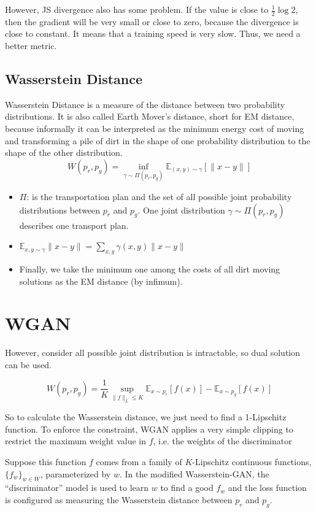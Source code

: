 However, JS divergence also has some problem. If the value is close to $\frac{1}{2}\log 2$, then the gradient will be very small or close to zero, because the divergence is close to constant. It means that a training speed is very slow. Thus, we need a better metric. 

\subsection{Wasserstein Distance}
Wasserstein Distance is a measure of the distance between two probability distributions. It is also called Earth Mover’s distance, short for EM distance, because informally it can be interpreted as the minimum energy cost of moving and transforming a pile of dirt in the shape of one probability distribution to the shape of the other distribution.
\begin{equation*}
	W(p_r, p_g) = \inf_{\gamma \sim \Pi(p_r, p_g)} \mathbb{E}_{(x, y) \sim \gamma}[\| x-y \|]
\end{equation*}

\begin{itemize}
	\item $\Pi$: is the transportation plan and the set of all possible joint probability distributions between $p_r$ and $p_g$. One joint distribution $\gamma \sim \Pi(p_r, p_g)$ describes one transport plan.\
	\item $\mathbb{E}_{x, y \sim \gamma} \| x-y \| = \sum_{x, y} \gamma(x, y) \| x-y \|$
	\item Finally, we take the minimum one among the costs of all dirt moving solutions as the EM distance (by infimum). 
\end{itemize}

\section{WGAN}
However, consider all possible joint distribution is intractable, so dual solution can be used. 

$$W(p_r, p_g) = \frac{1}{K} \sup_{\| f \|_L \leq K} \mathbb{E}_{x \sim p_r}[f(x)] - \mathbb{E}_{x \sim p_g}[f(x)]$$

So to calculate the Wasserstein distance, we just need to find a 1-Lipschitz function. To enforce the constraint, WGAN applies a very simple clipping to restrict the maximum weight value in $f$, i.e. the weights of the discriminator

Suppose this function $f$ comes from a family of $K$-Lipschitz continuous functions, $\{f_w\}_{w\in W}$, parameterized by $w$. In the modified Wasserstein-GAN, the ``discriminator'' model is used to learn $w$ to find a good $f_w$ and the loss function is configured as measuring the Wasserstein distance between $p_r$ and $p_g$.

